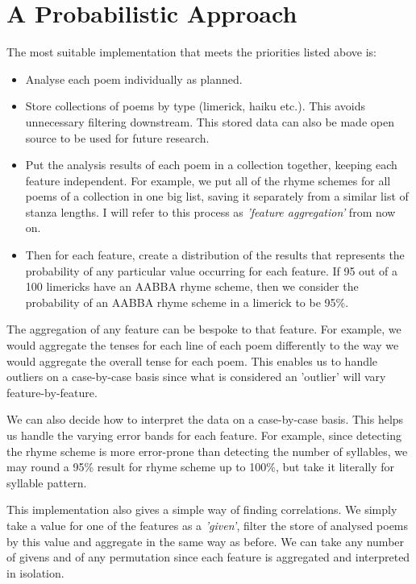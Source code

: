 \section{A Probabilistic Approach}

The most suitable implementation that meets the priorities listed above is:
\begin{itemize}
\item{Analyse each poem individually as planned.}
\item{Store collections of poems by type (limerick, haiku etc.). This avoids unnecessary filtering downstream. This stored data can also be made open source to be used for future research.}
\item{Put the analysis results of each poem in a collection together, keeping each feature independent. For example, we put all of the rhyme schemes for all poems of a collection in one big list, saving it separately from a similar list of stanza lengths. I will refer to this process as \textit{'feature aggregation'} from now on.}
\item{Then for each feature, create a distribution of the results that represents the probability of any particular value occurring for each feature. If 95 out of a 100 limericks have an AABBA rhyme scheme, then we consider the probability of an AABBA rhyme scheme in a limerick to be 95\%.}
\end{itemize}

The aggregation of any feature can be bespoke to that feature. For example, we would aggregate the tenses for each line of each poem differently to the way we would aggregate the overall tense for each poem. This enables us to handle outliers on a case-by-case basis since what is considered an 'outlier' will vary feature-by-feature.

We can also decide how to interpret the data on a case-by-case basis. This helps us handle the varying error bands for each feature. For example, since detecting the rhyme scheme is more error-prone than detecting the number of syllables, we may round a 95\% result for rhyme scheme up to 100\%, but take it literally for syllable pattern.

This implementation also gives a simple way of finding correlations. We simply take a value for one of the features as a \textit{'given'}, filter the store of analysed poems by this value and aggregate in the same way as before. We can take any number of givens and of any permutation since each feature is aggregated and interpreted in isolation.

